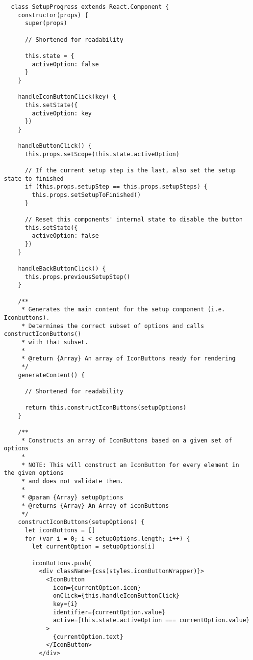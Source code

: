 \begin{lstlisting}
  class SetupProgress extends React.Component {
    constructor(props) {
      super(props)

      // Shortened for readability

      this.state = {
        activeOption: false
      }
    }

    handleIconButtonClick(key) {
      this.setState({
        activeOption: key
      })
    }

    handleButtonClick() {
      this.props.setScope(this.state.activeOption)

      // If the current setup step is the last, also set the setup state to finished
      if (this.props.setupStep == this.props.setupSteps) {
        this.props.setSetupToFinished()
      }

      // Reset this components' internal state to disable the button
      this.setState({
        activeOption: false
      })
    }

    handleBackButtonClick() {
      this.props.previousSetupStep()
    }

    /**
     * Generates the main content for the setup component (i.e. Iconbuttons).
     * Determines the correct subset of options and calls constructIconButtons()
     * with that subset.
     *
     * @return {Array} An array of IconButtons ready for rendering
     */
    generateContent() {

      // Shortened for readability

      return this.constructIconButtons(setupOptions)
    }

    /**
     * Constructs an array of IconButtons based on a given set of options
     *
     * NOTE: This will construct an IconButton for every element in the given options
     * and does not validate them.
     *
     * @param {Array} setupOptions
     * @returns {Array} An Array of iconButtons
     */
    constructIconButtons(setupOptions) {
      let iconButtons = []
      for (var i = 0; i < setupOptions.length; i++) {
        let currentOption = setupOptions[i]

        iconButtons.push(
          <div className={css(styles.iconButtonWrapper)}>
            <IconButton
              icon={currentOption.icon}
              onClick={this.handleIconButtonClick}
              key={i}
              identifier={currentOption.value}
              active={this.state.activeOption === currentOption.value}
            >
              {currentOption.text}
            </IconButton>
          </div>


\end{lstlisting}

